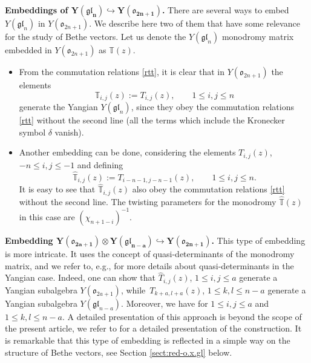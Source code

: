 \documentclass[10pt,a4paper]{amsart}
\theoremstyle{definition}
\def\TT{{\mathbb{T}}}
\begin{document}
{\bf Embeddings of $\boldsymbol{Y\!(\mathfrak{gl}_{n})\!\hookrightarrow \!Y(\mathfrak{o}_{2n+1})}$.}
There are several ways to embed $Y(\mathfrak{gl}_{n})$ in $Y(\mathfrak{o}_{2n+1})$. We describe here two of them that have some relevance for the study of Bethe vectors. Let us denote the $Y(\mathfrak{gl}_n)$
monodromy matrix embedded in $Y(\mathfrak{o}_{2n+1})$ as $\TT(z)$.
\begin{itemize}\itemsep=0pt
\item From the commutation relations \eqref{rtt}, it is clear that in $Y(\mathfrak{o}_{2n+1})$ the elements
\begin{equation}\label{Tgl}
\TT_{i,j}(z) := T_{i,j}(z) ,\qquad 1\leq i,j\leq n
\end{equation}
 generate the Yangian $Y(\mathfrak{gl}_{n})$, since they obey the
commutation relations \eqref{rtt} without the second line (all the terms
 which include the Kronecker symbol $\delta$ vanish).


\item
Another embedding can be done, considering the elements $T_{i,j}(z)$, $-n\leq i,j\leq -1$ and defining
\begin{equation}\label{em-sh}
 \hat{\TT}_{i,j}(z) := T_{i - n - 1,j - n -1}(z), \qquad 1\leq i,j\leq n.
\end{equation}
It is easy to see that $\hat{\TT}_{i,j}(z)$ also obey the commutation relations \eqref{rtt} without the second line.
The twisting parameters for the monodromy $\hat{\TT}(z)$ in this case are $(\chi_{n+1-i})^{-1}$.
\end{itemize}


{\bf Embedding $\boldsymbol{Y(\mathfrak{o}_{2a+1})\otimes Y(\mathfrak{gl}_{n-a})
\hookrightarrow Y(\mathfrak{o}_{2n+1})}$.}
This type of embedding is more intricate. It uses the concept of
quasi-determinants \cite{GelfandRetakh}  of the monodromy matrix, and we refer to, e.g., \cite{Molev} for more details about quasi-determinants in the Yangian case.
Indeed, one can show that $\widehat T_{i,j}(z)$, $1\leq i,j\leq a$ generate a Yangian subalgebra $Y(\mathfrak{o}_{2a+1})$,
while~${T_{k+a,l+a}(z)}$, $1\leq k,l\leq n-a$ generate a Yangian subalgebra $Y(\mathfrak{gl}_{n-a})$. Moreover, we have
 for $1\leq i,j\leq a$ and $1\leq k,l\leq n-a$.
A detailed presentation of this approach is beyond the scope of the present article, we
refer to \cite[Theorem 3.7 and Corollary 3.10]{JLM18} for a detailed presentation of the construction.
It is remarkable that this type of embedding
is reflected in a simple way
on the structure of Bethe vectors, see Section \ref{sect:red-o.x.gl} below.
\end{document}
